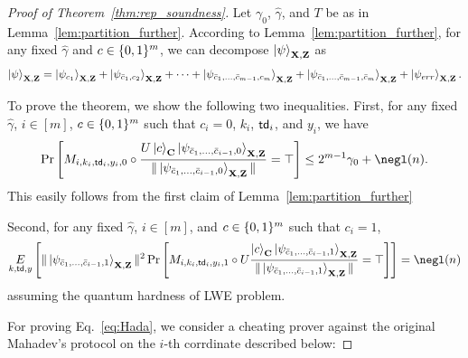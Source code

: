 \begin{proof}[Proof of Theorem~\ref{thm:rep_soundness}]
Let $\gamma_0$, $\hat{\gamma}$, and $T$ be as in Lemma~\ref{lem:partition_further}.
According to Lemma~\ref{lem:partition_further}, for any fixed $\hat{\gamma}$ and $c\in \{0,1\}^{m}$, we can decompose $\ket{\psi}_{\mathbf{X},\mathbf{Z}}$ as 
\begin{align*}
    \ket{\psi}_{\mathbf{X},\mathbf{Z}} =  \ket{\psi_{c_1}}_{\mathbf{X},\mathbf{Z}}+ \ket{\psi_{\bar{c}_1,c_2}}_{\mathbf{X},\mathbf{Z}} + \cdots + \ket{\psi_{\bar{c}_1,\dots, \bar{c}_{m-1},c_{m}}}_{\mathbf{X},\mathbf{Z}} + \ket{\psi_{\bar{c}_1,\dots, \bar{c}_{m-1},\bar{c}_{m}}}_{\mathbf{X},\mathbf{Z}}+ \ket{\psi_{err}}_{\mathbf{X},\mathbf{Z}}.
\end{align*}

To prove the theorem, we show the following two inequalities.
First,  for any  fixed $\hat{\gamma}$, $i\in[m]$, $c\in \{0,1\}^{m}$ such that $c_i=0$, $k_i$, $\mathsf{td}_i$, and $y_i$, we have
\begin{align}
 \Pr\left[M_{i,k_i,\td_i,y_i,0} \circ \frac{U\ket{c}_{\regC}\ket{\psi_{\bar{c}_1,\ldots,\bar{c}_{i-1},0}}_{\regX,\regZ}}{\|\ket{\psi_{\bar{c}_1,\ldots,\bar{c}_{i-1},0}}_{\regX,\regZ}\|}=\top\right]\leq 2^{m-1}\gamma_0+\negl(\secpar). \label{eq:Test}
\end{align}
This easily follows from the first claim of Lemma~\ref{lem:partition_further}

Second, for any  fixed $\hat{\gamma}$, $i\in[m]$, and $c\in \{0,1\}^{m}$ such that $c_i=1$,
\begin{align}
    \underset{k,\td,y}{E}\left[\|\ket{\psi_{\bar{c}_1,\dots,\bar{c}_{i-1},1}}_{\regX,\regZ}\|^2\Pr\left[M_{i,k_i,\td_i,y_i,1}\circ U\frac{\ket{c}_{\regC}\ket{\psi_{\bar{c}_1,\dots,\bar{c}_{i-1},1}}_{\regX,\regZ}}{\|\ket{\psi_{\bar{c}_1,\dots,\bar{c}_{i-1},1}}_{\regX,\regZ}\|} = \top\right]\right] = \negl(n) \label{eq:Hada}
\end{align}
assuming the quantum hardness of LWE problem.

For proving Eq.~\ref{eq:Hada}, we consider a cheating prover against the original Mahadev's protocol on the $i$-th corrdinate described below:


\end{proof}
